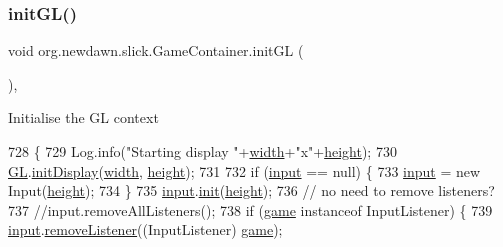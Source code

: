 \subsubsection{\texorpdfstring{init\+G\+L()}{initGL()}}
{\footnotesize\ttfamily void org.\+newdawn.\+slick.\+Game\+Container.\+init\+GL (\begin{DoxyParamCaption}{ }\end{DoxyParamCaption})\hspace{0.3cm}{\ttfamily [inline]}, {\ttfamily [protected]}}

Initialise the GL context 
\begin{DoxyCode}
728                             \{
729         Log.info(\textcolor{stringliteral}{"Starting display "}+\mbox{\hyperlink{classorg_1_1newdawn_1_1slick_1_1_game_container_a8c65160202b9f5aafde3fcf03e6155c9}{width}}+\textcolor{stringliteral}{"x"}+\mbox{\hyperlink{classorg_1_1newdawn_1_1slick_1_1_game_container_aac7312a21bbcaabec14be965c683d970}{height}});
730         \mbox{\hyperlink{classorg_1_1newdawn_1_1slick_1_1_game_container_a38d69b28b32e0b7e99555b8ae6061289}{GL}}.\mbox{\hyperlink{interfaceorg_1_1newdawn_1_1slick_1_1opengl_1_1renderer_1_1_s_g_l_a7c5e2c0345c667230bab6bc67865fd24}{initDisplay}}(\mbox{\hyperlink{classorg_1_1newdawn_1_1slick_1_1_game_container_a8c65160202b9f5aafde3fcf03e6155c9}{width}}, \mbox{\hyperlink{classorg_1_1newdawn_1_1slick_1_1_game_container_aac7312a21bbcaabec14be965c683d970}{height}});
731         
732         \textcolor{keywordflow}{if} (\mbox{\hyperlink{classorg_1_1newdawn_1_1slick_1_1_game_container_a2902f3d98d24fc41fc32d591f39eb587}{input}} == null) \{
733             \mbox{\hyperlink{classorg_1_1newdawn_1_1slick_1_1_game_container_a2902f3d98d24fc41fc32d591f39eb587}{input}} = \textcolor{keyword}{new} Input(\mbox{\hyperlink{classorg_1_1newdawn_1_1slick_1_1_game_container_aac7312a21bbcaabec14be965c683d970}{height}});
734         \}
735         \mbox{\hyperlink{classorg_1_1newdawn_1_1slick_1_1_game_container_a2902f3d98d24fc41fc32d591f39eb587}{input}}.\mbox{\hyperlink{classorg_1_1newdawn_1_1slick_1_1_input_a793fc05d5ffdf793eac37e6577bace4c}{init}}(\mbox{\hyperlink{classorg_1_1newdawn_1_1slick_1_1_game_container_aac7312a21bbcaabec14be965c683d970}{height}});
736         \textcolor{comment}{// no need to remove listeners?}
737         \textcolor{comment}{//input.removeAllListeners();}
738         \textcolor{keywordflow}{if} (\mbox{\hyperlink{classorg_1_1newdawn_1_1slick_1_1_game_container_a6a38bb26e45e1c884940caf35c7cfcdc}{game}} instanceof InputListener) \{
739             \mbox{\hyperlink{classorg_1_1newdawn_1_1slick_1_1_game_container_a2902f3d98d24fc41fc32d591f39eb587}{input}}.\mbox{\hyperlink{classorg_1_1newdawn_1_1slick_1_1_input_aae571a447fe305999e44efaf86c15251}{removeListener}}((InputListener) \mbox{\hyperlink{classorg_1_1newdawn_1_1slick_1_1_game_container_a6a38bb26e45e1c884940caf35c7cfcdc}{game}});

\end{DoxyCode}
